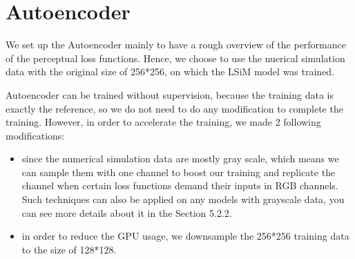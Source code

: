\documentclass[a4paper,12pt,twoside]{report}
\begin{document}
\section{Autoencoder}
We set up the Autoencoder mainly to have a rough overview of the performance of the perceptual loss functions. Hence, we choose to use the nuerical simulation data with the original size of 256*256, on which the LSiM model was trained. 

Autoencoder can be trained without supervision, because the training data is exactly the reference, so we do not need to do any modification to complete the training. However, in order to accelerate the training, we made 2 following modifications:
\begin{itemize}
\item since the numerical simulation data are mostly gray scale, which means we can sample them with one channel to boost our training and replicate the channel when certain loss functions demand their inputs in RGB channels. Such techniques can also be applied on any models with grayscale data, you can see more details about it in the Section 5.2.2.
\item in order to reduce the GPU usage, we downsample the 256*256 training data to the size of 128*128.

\end{itemize}
\end{document}

